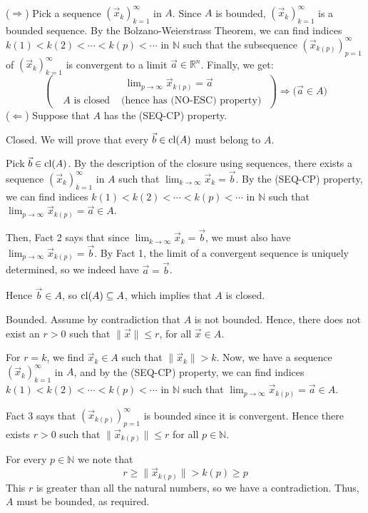 \documentclass[11pt]{article}
\makeatletter
\theoremstyle{definition}
\newcommand{\N}{\ensuremath{\mathbb{N}}}
\newcommand{\R}{\ensuremath{\mathbb{R}}}
\newenvironment{pf}[1][\proofname]{\par
  \pushQED{\qed}%
  \normalfont \topsep0\p@\relax
  \trivlist
  \item[\hskip\labelsep\itshape
  #1\@addpunct{.}]\ignorespaces
}{%
  \popQED\endtrivlist\@endpefalse
}
\makeatother
\begin{document}
\begin{pf}~

($\Rightarrow$) Pick a sequence $(\vec{x}_k)_{k=1}^\infty$ in $A$. Since $A$ is bounded, $(\vec{x}_k)_{k=1}^\infty$ is a bounded sequence. By the Bolzano-Weierstrass Theorem, we can find indices $k(1) < k(2) < \cdots < k(p) < \cdots$ in $\N$ such that the subsequence $(\vec{x}_{k(p)})_{p=1}^\infty$ of $(\vec{x}_k)_{k=1}^\infty$ is convergent to a limit $\vec{a} \in \R^n$. Finally, we get:
\[ \left( \begin{aligned} &\text{ $\lim\nolimits_{p\to\infty} \vec{x}_{k(p)} = \vec{a}$ } \\ \text{ $A$ is closed} & \text{ (hence has (NO-ESC) property) } \end{aligned} \right) \Rightarrow \Big( \vec{a} \in A \Big) \]
($\Leftarrow$) Suppose that $A$ has the (SEQ-CP) property.

{\sc Closed.} We will prove that every $\vec{b} \in {\rm cl}(A)$ must belong to $A$. 

Pick $\vec{b} \in {\rm cl}(A)$. By the description of the closure using sequences, there exists a sequence $(\vec{x}_k)_{k=1}^\infty$ in $A$ such that $\lim_{k\to\infty} \vec{x}_k = \vec{b}$. By the (SEQ-CP) property, we can find indices $k(1) < k(2) < \cdots < k(p) < \cdots$ in $\N$ such that $\lim_{p\to\infty} \vec{x}_{k(p)} = \vec{a} \in A$.

Then, Fact 2 says that since $\lim_{k\to\infty} \vec{x}_k = \vec{b}$, we must also have $\lim_{p\to\infty} \vec{x}_{k(p)} = \vec{b}$. By Fact 1, the limit of a convergent sequence is uniquely determined, so we indeed have $\vec{a} = \vec{b}$.

Hence $\vec{b} \in A$, so ${\rm cl}(A) \subseteq A$, which implies that $A$ is closed.

{\sc Bounded.} Assume by contradiction that $A$ is not bounded. Hence, there does not exist an $r > 0$ such that $\| \vec{x} \| \leq r$, for all $\vec{x} \in A$.

For $r = k$, we find $\vec{x}_k \in A$ such that $\| \vec{x}_k \| > k$. Now, we have a sequence $(\vec{x}_k)_{k=1}^\infty$ in $A$, and by the (SEQ-CP) property, we can find indices $k(1) < k(2) < \cdots < k(p) < \cdots$ in $\N$ such that $\lim_{p\to\infty} \vec{x}_{k(p)} = \vec{a} \in A$. 

Fact 3 says that $(\vec{x}_{k(p)})_{p=1}^\infty$ is bounded since it is convergent. Hence there exists $r > 0$ such that $\| \vec{x}_{k(p)} \| \leq r$ for all $p \in \N$. 

For every $p \in \N$ we note that
$$r \geq \| \vec{x}_{k(p)} \| > k(p) \geq p$$
This $r$ is greater than all the natural numbers, so we have a contradiction. Thus, $A$ must be bounded, as required.
\end{pf}
\end{document}
